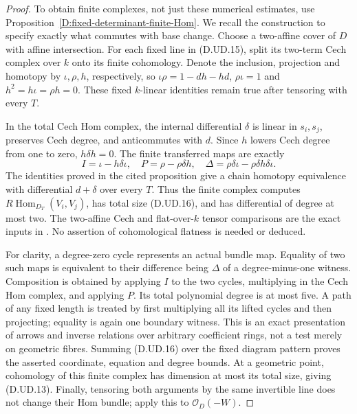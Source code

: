 \begin{proof}
To obtain finite complexes, not just these numerical estimates,
use Proposition~\ref{D:fixed-determinant-finite-Hom}. We recall
the construction to specify exactly what commutes with base
change. Choose a two-affine cover of $D$ with affine intersection.
For each fixed line in (D.UD.15), split its two-term Cech complex
over $k$ onto its finite cohomology. Denote the inclusion,
projection and homotopy by $\iota,\rho,h$, respectively, so
$\iota\rho=1-dh-hd$, $\rho\iota=1$ and
$h^2=h\iota=\rho h=0$. These fixed $k$-linear identities
remain true after tensoring with every $T$.

In the total Cech Hom complex, the internal differential
$\delta$ is linear in $s_i,s_j$, preserves Cech degree,
and anticommutes with $d$. Since $h$ lowers Cech degree
from one to zero, $h\delta h=0$. The finite transferred
maps are exactly
\[
 I=\iota-h\delta\iota,\quad
 P=\rho-\rho\delta h,\quad
 \Delta=\rho\delta\iota-\rho\delta h\delta\iota.
                                                        \tag{D.UD.17}
\]
The identities proved in the cited proposition give a chain
homotopy equivalence with differential $d+\delta$ over every
$T$. Thus the finite complex computes
$R\operatorname{Hom}_{D_T}(V_i,V_j)$, has total size
(D.UD.16), and has differential of degree at most two.
The two-affine Cech and flat-over-$k$ tensor comparisons are
the exact inputs in
\citep[Lemmas 30.2.5--30.2.6 and 30.5.1--30.5.2]
{C_StacksFiniteCechHom}. No assertion of cohomological
flatness is needed or deduced.

For clarity, a degree-zero cycle represents an actual bundle
map. Equality of two such maps is equivalent to their
difference being $\Delta$ of a degree-minus-one witness.
Composition is obtained by applying $I$ to the two cycles,
multiplying in the Cech Hom complex, and applying $P$.
Its total polynomial degree is at most five. A path of any
fixed length is treated by first multiplying all its lifted
cycles and then projecting; equality is again one boundary
witness. This is an exact presentation of arrows and inverse
relations over arbitrary coefficient rings, not a test merely
on geometric fibres. Summing (D.UD.16) over the fixed diagram
pattern proves the asserted coordinate, equation and degree
bounds. At a geometric point, cohomology of this finite complex
has dimension at most its total size, giving (D.UD.13).
Finally, tensoring both arguments by the same invertible line
does not change their Hom bundle; apply this to $\mathcal O_D(-W)$.
\end{proof}

